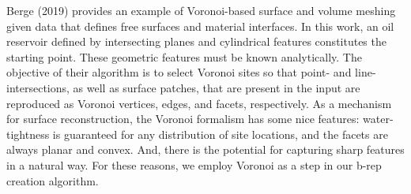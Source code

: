 Berge (2019) provides an example of Voronoi-based surface and volume meshing given data that defines free surfaces and material interfaces.  In this work, an oil reservoir defined by intersecting planes and cylindrical features constitutes the starting point.  These geometric features must be known analytically.  The objective of their algorithm is to select Voronoi sites so that point- and line-intersections, as well as surface patches, that are present in the input are reproduced as Voronoi vertices, edges, and facets, respectively.  As a mechanism for surface reconstruction, the Voronoi formalism has some nice features:  water-tightness is guaranteed for any distribution of site locations, and the facets are always planar and convex.  And, there is the potential for capturing sharp features in a natural way.  For these reasons, we employ Voronoi as a step in our b-rep creation algorithm. \\ \\
%
